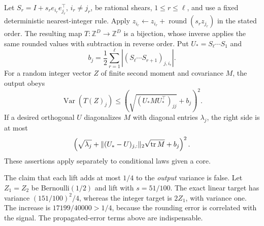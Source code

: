 \begin{theorem}
\label{III:U:thm:integer-lifting}
Let $S_r=I+s_re_{i_r}e_{j_r}^\top$, $i_r\ne j_r$, be rational
shears, $1\le r\le\ell$, and use a fixed deterministic nearest-integer
rule. Apply $z_{i_r}\leftarrow z_{i_r}+\operatorname{round}(s_rz_{j_r})$
in the stated order. The resulting map $T:\mathbb Z^D\to\mathbb Z^D$
is a bijection, whose inverse applies the same rounded values with
subtraction in reverse order. Put $U_*=S_\ell\cdots S_1$ and
\[
 b_j=\frac12\sum_{r=1}^\ell
       |(S_\ell\cdots S_{r+1})_{j,i_r}|.
\]
For a random integer vector $Z$ of finite second moment and covariance
$M$, the output obeys
\begin{equation}
 \operatorname{Var}(T(Z)_j)
 \le\left(\sqrt{(U_*MU_*^\top)_{jj}}+b_j\right)^2.
 \label{III:U:eq:lifting-variance}
\end{equation}
If a desired orthogonal $U$ diagonalizes $M$ with diagonal entries
$\lambda_j$, the right side is at most
\[
 \left(\sqrt{\lambda_j}+
    \|(U_*-U)_{j,:}\|_2\sqrt{\operatorname{tr} M}+b_j\right)^2.
\]
These assertions apply separately to conditional laws given a core.
\end{theorem}

The claim that each lift adds at most $1/4$ to the \emph{output}
variance is false. Let $Z_1=Z_2$ be Bernoulli$(1/2)$ and lift with
$s=51/100$. The exact linear target has variance $(151/100)^2/4$,
whereas the integer target is $2Z_1$, with variance one. The increase
is $17199/40000>1/4$, because the rounding error is correlated with
the signal. The propagated-error terms above are indispensable.

